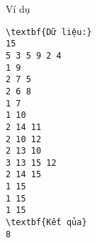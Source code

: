 Ví dụ
\begin{verbatim}
\textbf{Dữ liệu:} 
15
5 3 5 9 2 4
1 9
2 7 5
2 6 8
1 7
1 10
2 14 11
2 10 12
2 13 10
3 13 15 12
2 14 15
1 15
1 15
1 15
\textbf{Kết qủa} 
8 
\end{verbatim}